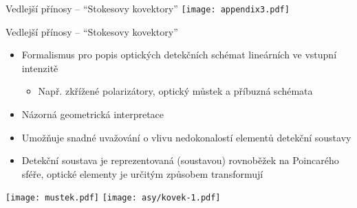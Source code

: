 \begin{frame}{Vedlejší přínosy -- ``Stokesovy kovektory''}
    \centering
    \texttt{[image: appendix3.pdf]}
\end{frame}

\begin{frame}{Vedlejší přínosy -- ``Stokesovy kovektory''}
    \begin{itemize}
        \item Formalismus pro popis optických detekčních schémat lineárních ve vstupní intenzitě
            \begin{itemize}
                \item Např. zkřížené polarizátory, optický můstek a příbuzná schémata
            \end{itemize}
        \item Názorná geometrická interpretace
        \item Umožňuje snadné uvažování o vlivu nedokonalostí elementů detekční soustavy
        \item Detekční soustava je reprezentovaná (soustavou) rovnoběžek na Poincarého sféře, optické elementy je určitým způsobem transformují
    \end{itemize}
    \begin{center}
        \texttt{[image: mustek.pdf]}
        \texttt{[image: asy/kovek-1.pdf]}
    \end{center}
    
\end{frame}

